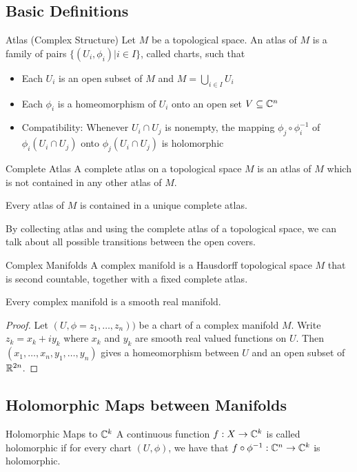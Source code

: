 \documentclass[a4paper]{article}
\begin{document}
\subsection{Basic Definitions}
\begin{defn}{Atlas (Complex Structure)}{} Let $M$ be a topological space. An atlas of $M$ is a family of pairs $\{(U_i,\phi_i)|i\in I\}$, called charts, such that 
\begin{itemize}
\item Each $U_i$ is an open subset of $M$ and $M=\bigcup_{i\in I}U_i$
\item Each $\phi_i$ is a homeomorphism of $U_i$ onto an open set $V\subseteq\mathbb{C}^n$
\item Compatibility: Whenever $U_i\cap U_j$ is nonempty, the mapping $\phi_j\circ\phi_i^{-1}$ of $\phi_i(U_i\cap U_j)$ onto $\phi_j(U_i\cap U_j)$ is holomorphic
\end{itemize}
\end{defn}

\begin{defn}{Complete Atlas}{} A complete atlas on a topological space $M$ is an atlas of $M$ which is not contained in any other atlas of $M$. 
\end{defn}

\begin{lmm}{}{} Every atlas of $M$ is contained in a unique complete atlas. 
\end{lmm}

By collecting atlas and using the complete atlas of a topological space, we can talk about all possible transitions between the open covers. 

\begin{defn}{Complex Manifolds}{} A complex manifold is a Hausdorff topological space $M$ that is second countable, together with a fixed complete atlas. 
\end{defn}

\begin{prp}{}{} Every complex manifold is a smooth real manifold. \tcbline
\begin{proof}
Let $(U,\phi=z_1,\dots,z_n))$ be a chart of a complex manifold $M$. Write $z_k=x_k+iy_k$ where $x_k$ and $y_k$ are smooth real valued functions on $U$. Then $(x_1,\dots,x_n,y_1,\dots,y_n)$ gives a homeomorphism between $U$ and an open subset of $\mathbb{R}^{2n}$. 
\end{proof}
\end{prp}

\subsection{Holomorphic Maps between Manifolds}
\begin{defn}{Holomorphic Maps to $\mathbb{C}^k$}{} A continuous function $f:X\to\mathbb{C}^k$ is called holomorphic if for every chart $(U,\phi)$, we have that $f\circ\phi^{-1}:\mathbb{C}^n\to\mathbb{C}^k$ is holomorphic. 
\end{defn}
\end{document}

